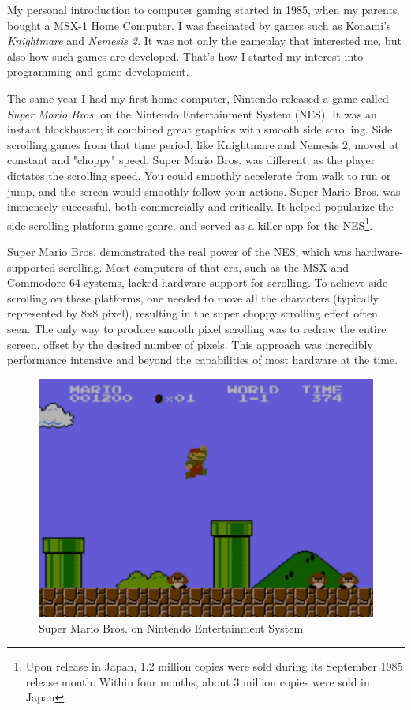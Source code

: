 
My personal introduction to computer gaming started in 1985, when my parents bought a MSX-1 Home Computer. I was fascinated by games such as Konami's \textit{Knightmare} and \textit{Nemesis 2}. It was not only the gameplay that interested me, but also how such games are developed. That's how I started my interest into programming and game development.\\
\par
The same year I had my first home computer, Nintendo released a game called \textit{Super Mario Bros.} on the Nintendo Entertainment System (NES). It was an instant blockbuster; it combined great graphics with smooth side scrolling. Side scrolling games from that time period, like Knightmare and Nemesis 2, moved at constant and "choppy" speed. Super Mario Bros. was different, as the player dictates the scrolling speed. You could smoothly accelerate from walk to run or jump, and the screen would smoothly follow your actions. Super Mario Bros. was immensely successful, both commercially and critically. It helped popularize the side-scrolling platform game genre, and served as a killer app for the NES\footnote{Upon release in Japan, 1.2 million copies were sold during its September 1985 release month. Within four months, about 3 million copies were sold in Japan}.\\

\par
Super Mario Bros. demonstrated the real power of the NES, which was hardware-supported scrolling. Most computers of that era, such as the MSX and Commodore 64 systems, lacked hardware support for scrolling. To achieve side-scrolling on these platforms, one needed to move all the characters (typically represented by 8x8 pixel), resulting in the super choppy scrolling effect often seen. The only way to produce smooth pixel scrolling was to redraw the entire screen, offset by the desired number of pixels. This approach was incredibly performance intensive and beyond the capabilities of most hardware at the time.\\

\begin{figure}[H]
  \centering
 \includegraphics[width=1.0\textwidth]{screenshots_300dpi/Mario_Bros.png}
\caption{Super Mario Bros. on Nintendo Entertainment System}
\end{figure}


